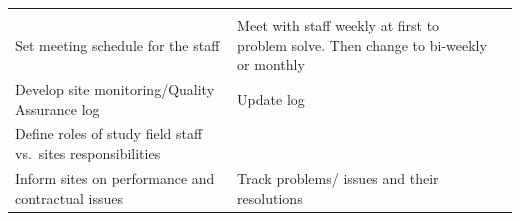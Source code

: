 \documentclass[]{book}
\theoremstyle{definition}
\theoremstyle{definition}
\theoremstyle{definition}
\theoremstyle{remark}
\begin{document}
\begin{longtable}[]{@{}lll@{}}
\begin{minipage}[t]{0.27\columnwidth}
\end{minipage} & \begin{minipage}[t]{0.33\columnwidth}\raggedright\strut
\strut
\end{minipage} & \begin{minipage}[t]{0.30\columnwidth}\raggedright\strut
\strut
\end{minipage}\tabularnewline
\begin{minipage}[t]{0.27\columnwidth}\raggedright\strut
Set meeting schedule for the staff\strut
\end{minipage} & \begin{minipage}[t]{0.33\columnwidth}\raggedright\strut
Meet with staff weekly at first to problem solve. Then change to
bi-weekly or monthly\strut
\end{minipage} & \begin{minipage}[t]{0.30\columnwidth}\raggedright\strut
\strut
\end{minipage}\tabularnewline
\begin{minipage}[t]{0.27\columnwidth}\raggedright\strut
Develop site monitoring/Quality Assurance log\strut
\end{minipage} & \begin{minipage}[t]{0.33\columnwidth}\raggedright\strut
Update log\strut
\end{minipage} & \begin{minipage}[t]{0.30\columnwidth}\raggedright\strut
\strut
\end{minipage}\tabularnewline
\begin{minipage}[t]{0.27\columnwidth}\raggedright\strut
Define roles of study field staff vs.~sites responsibilities\strut
\end{minipage} & \begin{minipage}[t]{0.33\columnwidth}\raggedright\strut
\strut
\end{minipage} & \begin{minipage}[t]{0.30\columnwidth}\raggedright\strut
\strut
\end{minipage}\tabularnewline
\begin{minipage}[t]{0.27\columnwidth}\raggedright\strut
Inform sites on performance and contractual issues\strut
\end{minipage} & \begin{minipage}[t]{0.33\columnwidth}\raggedright\strut
Track problems/ issues and their resolutions\strut
\end{minipage} & \begin{minipage}[t]{0.30\columnwidth}\raggedright\strut

\end{minipage}
\end{longtable}
\end{document}
